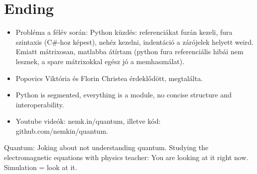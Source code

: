 \chapter{Ending}

\begin{itemize}
    \item Probléma a félév során: Python küzdés: referenciákat furán kezeli, fura szintaxis (C\#-hoz képest), nehéz kezelni, indentáció a zárójelek helyett weird. Emiatt mátrixosan, matlabba átírtam (python fura referenciális hibái nem lesznek, a spare mátrixokkal egész jó a memhasználat).
    \item Popovics Viktória és Florin Christea érdeklődött, megtalálta.
    \item Python is segmented, everything is a module, no concise structure and interoperability.
    \item Youtube videók: nemk.in/quantum, illetve kód: github.com/nemkin/quantum.
\end{itemize}

Quantum: Joking about not understanding quantum. Studying the electromagnetic equations with physics teacher: You are looking at it right now. Simulation = look at it.